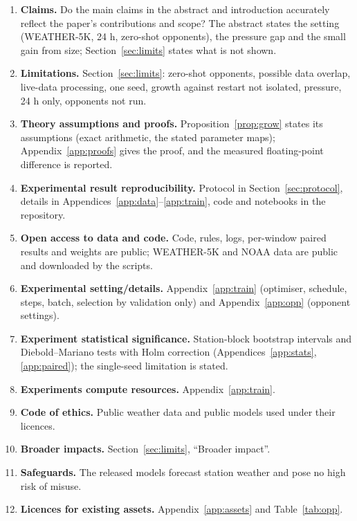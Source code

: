 \documentclass{article}
\begin{document}
\begin{enumerate}[leftmargin=1.5em,itemsep=3pt]
\item \textbf{Claims.} Do the main claims in the abstract and introduction accurately reflect the paper's contributions
and scope? \answerYes{} The abstract states the setting (WEATHER-5K, 24 h, zero-shot opponents), the pressure gap and
the small gain from size; Section~\ref{sec:limits} states what is not shown.
\item \textbf{Limitations.} \answerYes{} Section~\ref{sec:limits}: zero-shot opponents, possible data overlap, live-data
processing, one seed, growth against restart not isolated, pressure, 24 h only, opponents not run.
\item \textbf{Theory assumptions and proofs.} \answerYes{} Proposition~\ref{prop:grow} states its assumptions (exact
arithmetic, the stated parameter maps); Appendix~\ref{app:proofs} gives the proof, and the measured floating-point
difference is reported.
\item \textbf{Experimental result reproducibility.} \answerYes{} Protocol in Section~\ref{sec:protocol}, details in
Appendices~\ref{app:data}--\ref{app:train}, code and notebooks in the repository.
\item \textbf{Open access to data and code.} \answerYes{} Code, rules, logs, per-window paired results and weights are
public; WEATHER-5K and NOAA data are public and downloaded by the scripts.
\item \textbf{Experimental setting/details.} \answerYes{} Appendix~\ref{app:train} (optimiser, schedule, steps, batch,
selection by validation only) and Appendix~\ref{app:opp} (opponent settings).
\item \textbf{Experiment statistical significance.} \answerYes{} Station-block bootstrap intervals and
Diebold--Mariano tests with Holm correction (Appendices~\ref{app:stats}, \ref{app:paired}); the single-seed limitation is
stated.
\item \textbf{Experiments compute resources.} \answerYes{} Appendix~\ref{app:train}.
\item \textbf{Code of ethics.} \answerYes{} Public weather data and public models used under their licences.
\item \textbf{Broader impacts.} \answerYes{} Section~\ref{sec:limits}, ``Broader impact''.
\item \textbf{Safeguards.} \answerNA{} The released models forecast station weather and pose no high risk of misuse.
\item \textbf{Licences for existing assets.} \answerYes{} Appendix~\ref{app:assets} and Table~\ref{tab:opp}.

\end{enumerate}
\end{document}

